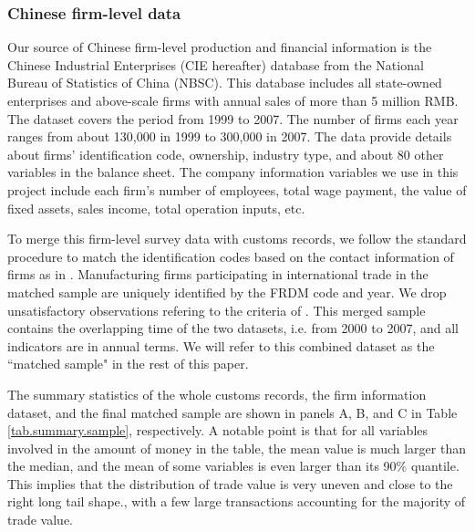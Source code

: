 \documentclass[12pt]{article}
\begin{document}
\subsubsection{Chinese firm-level data} \label{Data-CIE}

Our source of Chinese firm-level production and financial information is the Chinese Industrial Enterprises (CIE hereafter) database from the National Bureau of Statistics of China (NBSC). This database includes all state-owned enterprises and above-scale firms with annual sales of more than 5 million RMB. The dataset covers the period from 1999 to 2007. The number of firms each year ranges from about 130,000 in 1999 to 300,000 in 2007. The data provide details about firms’ identification code, ownership, industry type, and about 80 other variables in the balance sheet. The company information variables we use in this project include each firm's number of employees, total wage payment, the value of fixed assets, sales income, total operation inputs, etc.

To merge this firm-level survey data with customs records, we follow the standard procedure to match the identification codes based on the contact information of firms as in \cite{fan-li-yeaple2015}. Manufacturing firms participating in international trade in the matched sample are uniquely identified by the FRDM code and year. We drop unsatisfactory observations refering to the criteria of \cite{bkl2021}. This merged sample contains the overlapping time of the two datasets, i.e. from 2000 to 2007, and all indicators are in annual terms. We will refer to this combined dataset as the ``matched sample" in the rest of this paper.

The summary statistics of the whole customs records, the firm information dataset, and the final matched sample are shown in panels A, B, and C in Table \ref{tab.summary.sample}, respectively. A notable point is that for all variables involved in the amount of money in the table, the mean value is much larger than the median, and the mean of some variables is even larger than its 90\% quantile. This implies that the distribution of trade value is very uneven and close to the right long tail shape., with a few large transactions accounting for the majority of trade value.
\end{document}

